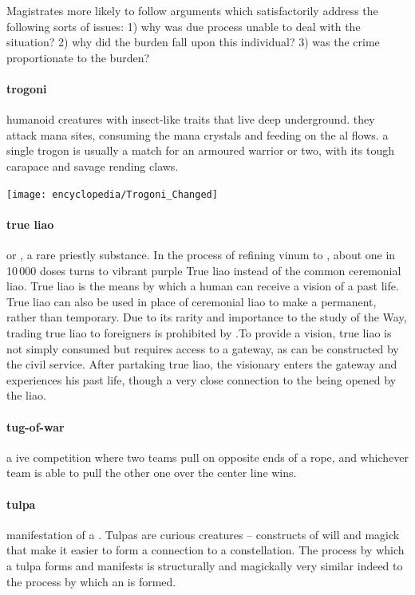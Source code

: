 Magistrates more likely to follow arguments which satisfactorily address the following sorts of issues: 1) why was due process unable to deal with the situation? 2) why did the burden fall upon this individual? 3) was the crime proportionate to the burden? 
\bigparagraphendtwiddle
\paragraph{trogoni} humanoid creatures with insect-like traits that live deep underground. they attack mana sites, consuming the mana crystals and feeding on the al flows. a single trogon is usually a match for an armoured warrior or two, with its tough carapace and savage rending claws. \begin{center}\texttt{[image: encyclopedia/Trogoni\_Changed]}\end{center}
\paragraph{true liao} or , a rare priestly substance. In the process of refining vinum to , about one in 10\,000 doses turns to vibrant purple True liao instead of the common ceremonial liao. True liao is the means by which a human can receive a vision of a past life. True liao can also be used in place of ceremonial liao to make a  permanent, rather than temporary. Due to its rarity and importance to the study of the Way, trading true liao to foreigners is prohibited by .\localpar To provide a vision, true liao is not simply consumed but requires access to a gateway, as can be constructed by the civil service. After partaking true liao, the visionary enters the gateway and experiences his past life, though a very close connection to the  being opened by the liao.
\paragraph{tug-of-war} a ive competition where two teams pull on opposite ends of a rope, and whichever team is able to pull the other one over the center line wins.
\paragraph{tulpa} manifestation of a . Tulpas are curious creatures – constructs of will and magick that make it easier to form a connection to a constellation. The process by which a tulpa forms and manifests is structurally and magickally very similar indeed to the process by which an  is formed.
